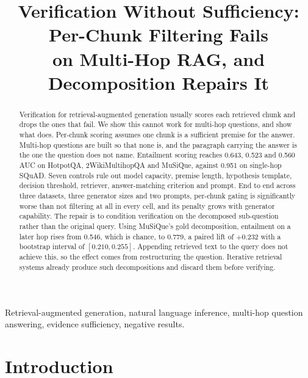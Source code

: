 \documentclass[conference]{IEEEtran}
\begin{document}
\title{Verification Without Sufficiency: Per-Chunk Filtering Fails\\
on Multi-Hop RAG, and Decomposition Repairs It}

\author{
}

\maketitle

\begin{abstract}
Verification for retrieval-augmented generation usually scores each retrieved
chunk and drops the ones that fail. We show this cannot work for multi-hop
questions, and show what does. Per-chunk scoring assumes one chunk is a
sufficient premise for the answer. Multi-hop questions are built so that none
is, and the paragraph carrying the answer is the one the question does not name.
Entailment scoring reaches 0.643, 0.523 and 0.560 AUC on HotpotQA,
2WikiMultihopQA and MuSiQue, against 0.951 on single-hop SQuAD. Seven controls
rule out model capacity, premise length, hypothesis template, decision
threshold, retriever, answer-matching criterion and prompt. End to end across
three datasets, three generator sizes and two prompts, per-chunk gating is
significantly worse than not filtering at all in every cell, and its penalty
grows with generator capability. The repair is to condition verification on the
decomposed sub-question rather than the original query. Using MuSiQue's gold
decomposition, entailment on a later hop rises from 0.546, which is chance, to
0.779, a paired lift of $+0.232$ with a bootstrap interval of $[0.210, 0.255]$.
Appending retrieved text to the query does not achieve this, so the effect comes
from restructuring the question. Iterative retrieval systems already produce
such decompositions and discard them before verifying.
\end{abstract}

\begin{IEEEkeywords}
Retrieval-augmented generation, natural language inference, multi-hop question
answering, evidence sufficiency, negative results.
\end{IEEEkeywords}

\section{Introduction}
\label{sec:intro}
\end{document}
